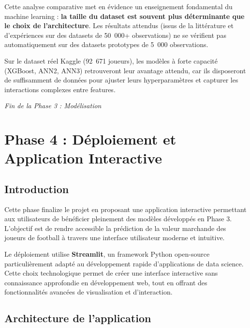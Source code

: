 \documentclass[12pt,a4paper]{article}
\begin{document}
Cette analyse comparative met en évidence un enseignement fondamental du machine
learning : \textbf{la taille du dataset est souvent plus déterminante que le choix
de l'architecture}. Les résultats attendus (issus de la littérature et d'expériences
sur des datasets de 50~000+ observations) ne se vérifient pas automatiquement sur
des datasets prototypes de 5~000 observations.

Sur le dataset réel Kaggle (92~671 joueurs), les modèles à forte capacité (XGBoost,
ANN2, ANN3) retrouveront leur avantage attendu, car ils disposeront de suffisamment
de données pour ajuster leurs hyperparamètres et capturer les interactions complexes
entre features.

\vspace{1cm}
\begin{center}
\textit{Fin de la Phase 3 : Modélisation}
\end{center}


\newpage
\section{Phase 4 : Déploiement et Application Interactive}

\subsection{Introduction}

Cette phase finalize le projet en proposant une application interactive permettant aux utilisateurs de bénéficier pleinement des modèles développés en Phase 3. L'objectif est de rendre accessible la prédiction de la valeur marchande des joueurs de football à travers une interface utilisateur moderne et intuitive.

Le déploiement utilise \textbf{Streamlit}, un framework Python open-source particulièrement adapté au développement rapide d'applications de data science. Cette choix technologique permet de créer une interface interactive sans connaissance approfondie en développement web, tout en offrant des fonctionnalités avancées de visualisation et d'interaction.

\subsection{Architecture de l'application}
\end{document}
